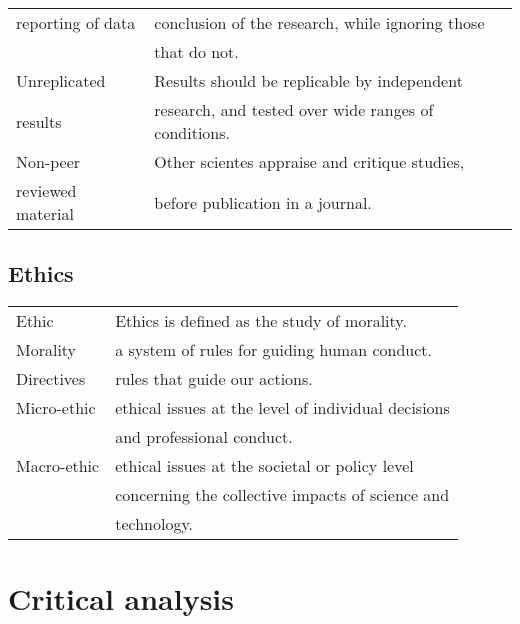 \documentclass[5pt]{article}
\begin{document}
\begin{multicols}{2}
\begin{tabular}{ll}
    reporting of data   & conclusion of the research, while ignoring those\\
                        & that do not.\\
    \hline
    Unreplicated        & Results should be replicable by independent\\
    results             & \small{research, and tested over wide ranges of conditions}.\\
    \hline
    Non-peer            & Other scientes appraise and critique studies,\\
    reviewed material   & before publication in a journal.\\
\end{tabular}


\subsection{Ethics}
\begin{tabular}{ll}
    Ethic       & Ethics is defined as the study of morality.\\
    Morality    & a system of rules for guiding human conduct.\\
    Directives  & rules that guide our actions.\\
    Micro-ethic & ethical issues at the level of individual decisions\\
                & and professional conduct.\\
    Macro-ethic & ethical issues at the societal or policy level\\
                & concerning the collective impacts of science and\\
                & technology.\\
\end{tabular}

\section{Critical analysis}


\end{multicols}
\end{document}
